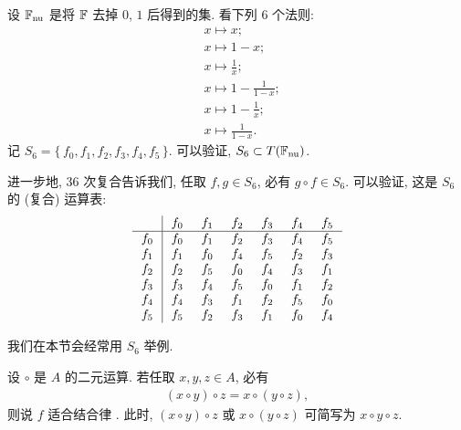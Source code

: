 \begin{example}
    设 $\mathbb{F}_{\mathrm{nu}}$ 是将 $\mathbb{F}$ 去掉 $0$, $1$ 后得到的集. 看下列 $6$ 个法则:
    \begin{align*}
         & x \mapsto x; \tag*{$f_0 \colon$}               \\
         & x \mapsto 1-x; \tag*{$f_1 \colon$}             \\
         & x \mapsto \frac{1}{x}; \tag*{$f_2 \colon$}     \\
         & x \mapsto 1-\frac{1}{1-x}; \tag*{$f_3 \colon$} \\
         & x \mapsto 1-\frac{1}{x}; \tag*{$f_4 \colon$}   \\
         & x \mapsto \frac{1}{1-x}. \tag*{$f_5 \colon$}
    \end{align*}
    记 $S_6 = \{\, f_0,f_1,f_2,f_3,f_4,f_5 \,\}$. 可以验证, $S_6 \subset T(\mathbb{F}_{\mathrm{nu}})$.

    进一步地, $36$ 次复合告诉我们, 任取 $f,g \in S_6$, 必有 $g \circ f \in S_6$. 可以验证, 这是 $S_6$ 的 (复合) 运算表:
    \begin{align*}
        \arraycolsep=0.25cm
        \begin{array}{c|cccccc}
            \     & f_{0} & f_{1} & f_{2} & f_{3} & f_{4} & f_{5} \\ \hline
            f_{0} & f_{0} & f_{1} & f_{2} & f_{3} & f_{4} & f_{5} \\
            f_{1} & f_{1} & f_{0} & f_{4} & f_{5} & f_{2} & f_{3} \\
            f_{2} & f_{2} & f_{5} & f_{0} & f_{4} & f_{3} & f_{1} \\
            f_{3} & f_{3} & f_{4} & f_{5} & f_{0} & f_{1} & f_{2} \\
            f_{4} & f_{4} & f_{3} & f_{1} & f_{2} & f_{5} & f_{0} \\
            f_{5} & f_{5} & f_{2} & f_{3} & f_{1} & f_{0} & f_{4} \\
        \end{array}
    \end{align*}

    我们在本节会经常用 $S_6$ 举例.
\end{example}

\begin{definition}
    设 $\circ$ 是 $A$ 的二元运算. 若任取 $x,y,z \in A$, 必有
    \begin{align*}
        (x \circ y) \circ z = x \circ (y \circ z),
    \end{align*}
    则说 $f$ 适合结合律 . 此时, $(x \circ y) \circ z$ 或 $x \circ (y \circ z)$ 可简写为 $x \circ y \circ z$.
\end{definition}

